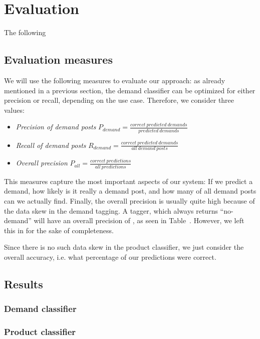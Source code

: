 
\section{Evaluation}
\label{sec:evaluation}

The following \todo{}

\subsection{Evaluation measures}
\label{sub:evaluation_measures}
We will use the following measures to evaluate our approach:
as already mentioned in a previous section, the demand classifier can be optimized for either precision or recall, depending on the use case.
Therefore, we consider three values:
\begin{itemize}
	\item
		\emph{Precision of demand posts}
		$P_{demand} = \frac{correct~predicted~demands}{predicted~demands}$
	\item
		\emph{Recall of demand posts}
		$R_{demand} = \frac{correct~predicted~demands}{all~demand~posts}$
	\item
		\emph{Overall precision}
		$P_{all} = \frac{correct~predictions}{all~predictions}$
\end{itemize}
This measures capture the most important aspects of our system: If we predict a demand, how likely is it really a demand post, and how many of all demand posts can we actually find.
Finally, the overall precision is usually quite high because of the data skew in the demand tagging.
A tagger, which always returns ``no-demand'' will have an overall precision of , as seen in Table~.
However, we left this in for the sake of completeness.

Since there is no such data skew in the product classifier, we just consider the overall accuracy, i.e. what percentage of our predictions were correct.


\subsection{Results}
\label{sub:results}

\subsubsection{Demand classifier}
\label{ssub:demand_classifier}


\subsubsection{Product classifier}
\label{ssub:product_classifier}



